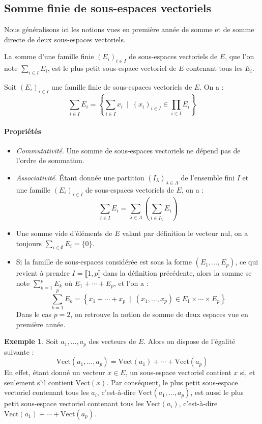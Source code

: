 \documentclass[french]{article}
\newcommand{\Vect}{\text{Vect}}
\theoremstyle{plain}
\theoremstyle{definition}
\newtheorem*{ex}{Exemple}
\theoremstyle{remark}
\begin{document}
\subsection{Somme finie de sous-espaces vectoriels}

Nous généralisons ici les notions vues en première année de somme et de somme directe de deux sous-espaces vectoriels.

\begin{dfn}
	La somme d'une famille finie $(E_i)_{i\in I}$ de sous-espaces vectoriels de $E$, que l'on note $\displaystyle\sum_{i\in I}E_i$, est le plus petit sous-espace vectoriel de $E$ contenant tous les $E_i$.
\end{dfn}

\begin{prop}
	Soit $(E_i)_{i\in I}$ une famille finie de sous-espaces vectoriels de $E$. On a : $$\sum_{i\in I}E_i=\left\{\sum_{i\in I}x_i\ \mid\ (x_i)_{i\in I}\in\prod_{i\in I} E_i\right\}$$
\end{prop}

\paragraph{Propriétés}
\begin{itemize}
	\item \textit{Commutativité}. Une somme de sous-espaces vectoriels ne dépend pas de l'ordre de sommation.
	\item \textit{Associativité}. Étant donnée une partition $(I_\lambda)_{\lambda\in\Lambda}$ de l'ensemble fini $I$ et une famille $(E_i)_{i\in I}$ de sous-espaces vectoriels de $E$, on a : $$\sum_{i\in I}E_i=\sum_{\lambda\in\Lambda}\left(\sum_{i\in I_\lambda}E_i\right)$$
	\item Une somme vide d'éléments de $E$ valant par définition le vecteur nul, on a toujours $\displaystyle\sum_{i\in\emptyset}E_i=\{0\}$.
	\item Si la famille de sous-espaces considérée est sous la forme $(E_1,\ldots,E_p)$, ce qui revient à prendre $I=\llbracket1,p\rrbracket$ dans la définition précédente, alors la somme se note $\displaystyle\sum_{k=1}^{p}E_k$ où $E_1+\cdots+E_p$, et l'on a : $$\sum_{k=1}^{p}E_k=\left\{x_1+\cdots+x_p\ \mid\ (x_1,\ldots,x_p)\in E_1\times\cdots\times E_p\right\}$$ Dans le cas $p=2$, on retrouve la notion de somme de deux espaces vue en première année.
\end{itemize}

\begin{ex}
	Soit $a_1,\ldots,a_p$ des vecteurs de $E$. Alors on dispose de l'égalité suivante : $$\Vect(a_1,\ldots,a_p)=\Vect(a_1)+\cdots+\Vect(a_p)$$ En effet, étant donné un vecteur $x\in E$, un sous-espace vectoriel contient $x$ si, et seulement s'il contient $\Vect(x)$. Par conséquent, le plus petit sous-espace vectoriel contenant tous les $a_i$, c'est-à-dire $\Vect(a_1,\ldots,a_p)$, est aussi le plus petit sous-espace vectoriel contenant tous les $\Vect(a_i)$, c'est-à-dire $\Vect(a_1)+\cdots+\Vect(a_p)$.
\end{ex}
\end{document}
